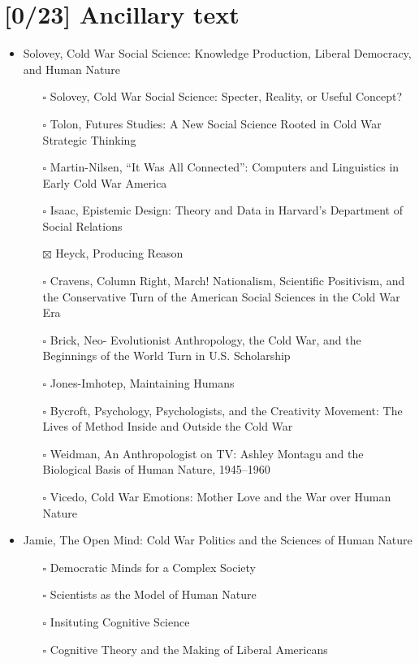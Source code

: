 \documentclass[paper=B6,portrait,twoside=true,twocolumn=false,headinclude=true,footinclude=false,fontsize=12,BCOR=10mm,DIV=calc,pagesize=auto,titlepage=firstiscover,mpinclude=false,headings=normal,headings=twolinechapter,open=right,toc=graduated,chapterprefix=false,numbers=endperiod,parskip=half+]{scrbook}
\theoremstyle{definition}
\begin{document}
\section{[0/23] Ancillary text}
\label{sec:org5d2b0b7}
\begin{itemize}
\item\relax [1/11] Solovey, Cold War Social Science: Knowledge Production, Liberal
Democracy, and Human Nature
\begin{itemize}
\item[{$\square$}] Solovey, Cold War Social Science: Specter, Reality, or Useful Concept?
\item[{$\square$}] Tolon, Futures Studies: A New Social Science Rooted in Cold War Strategic Thinking
\item[{$\square$}] Martin-Nilsen, “It Was All Connected”: Computers and Linguistics in Early Cold War America
\item[{$\square$}] Isaac, Epistemic Design: Theory and Data in Harvard’s Department of Social Relations
\item[{$\boxtimes$}] Heyck, Producing Reason
\item[{$\square$}] Cravens, Column Right, March! Nationalism, Scientific Positivism, and the Conservative Turn of the American Social Sciences in the Cold War Era
\item[{$\square$}] Brick, Neo- Evolutionist Anthropology, the Cold War, and the Beginnings of the World Turn in U.S. Scholarship
\item[{$\square$}] Jones-Imhotep, Maintaining Humans
\item[{$\square$}] Bycroft, Psychology, Psychologists, and the Creativity Movement: The Lives of Method Inside and Outside the Cold War
\item[{$\square$}] Weidman, An Anthropologist on TV: Ashley Montagu and the Biological
Basis of Human Nature, 1945–1960
\item[{$\square$}] Vicedo, Cold War Emotions: Mother Love and the War over Human Nature
\end{itemize}
\item\relax [0/5] Jamie, The Open Mind: Cold War Politics and the Sciences of Human
Nature
\begin{itemize}
\item[{$\square$}] Democratic Minds for a Complex Society
\item[{$\square$}] Scientists as the Model of Human Nature
\item[{$\square$}] Insituting Cognitive Science
\item[{$\square$}] Cognitive Theory and the Making of Liberal Americans

\end{itemize}
\end{itemize}
\end{document}
